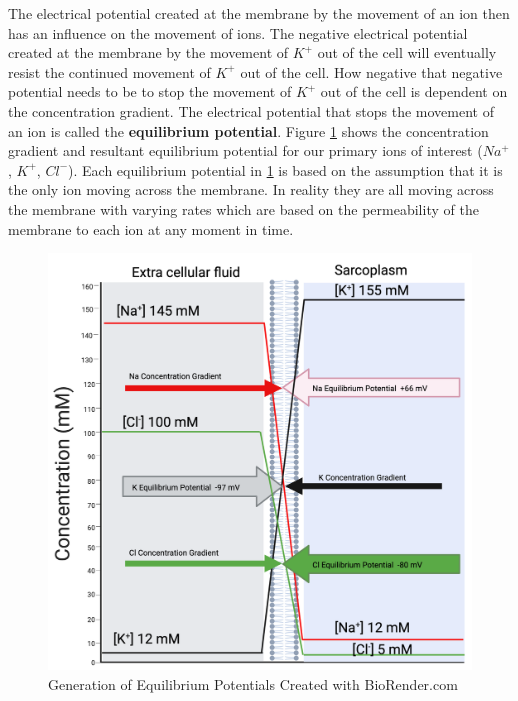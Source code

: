 The electrical potential created at the membrane by the movement of an ion then has an influence on the movement of ions. The negative electrical potential created at the membrane by the movement of $K^+$ out of the cell will eventually resist the continued movement of $K^+$ out of the cell. How negative that negative potential needs to be to stop the movement of $K^+$ out of the cell is dependent on the concentration gradient.\footnotemark{} The electrical potential that stops the movement of an ion is called the \textbf{equilibrium potential}. Figure \ref{fig:equilibrium_potential} shows the concentration gradient and resultant equilibrium potential for our primary ions of interest ($Na^+$, $K^+$, $Cl^-$). Each equilibrium potential in \ref{fig:equilibrium_potential} is based on the assumption that it is the only ion moving across the membrane. In reality they are all moving across the membrane with varying rates which are based on the permeability of the membrane to each ion at any moment in time.\footnotemark{}

\begin{figure}[!ht]
    \centering
    \includegraphics{./figure/equilibrium_potential.png}
    \caption{Generation of Equilibrium Potentials \footnotesize{Created with BioRender.com}}
    \label{fig:equilibrium_potential}
\end{figure}

